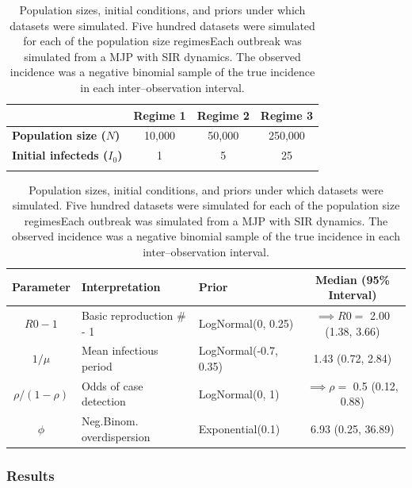 \begin{table}[!ht]
	\label{tab:lna_coverage_sim}
	\caption{Population sizes, initial conditions, and priors under which datasets were simulated. Five hundred datasets were simulated for each of the population size regimesEach outbreak was simulated from a MJP with SIR dynamics. The observed incidence was a negative binomial sample of the true incidence in each inter--observation interval.}\small
	\centering
	\begin{tabular}{lccc}
		
		& \textbf{Regime 1} & \textbf{Regime 2} & \textbf{Regime 3} \\\hline
		\textbf{Population size ($ N $)} & 10,000 & 50,000 & 250,000 \\ 
		\textbf{Initial infecteds ($ I_0 $)} & 1 & 5 & 25 \\
		\hline
		&&&
	\end{tabular} 

	\begin{tabular}{cllc}
		\textbf{Parameter} & \textbf{Interpretation} & \textbf{Prior} & \textbf{Median (95\% Interval)} \\ \hline
		$ R0-1 $ & Basic reproduction \# - 1 & LogNormal(0, 0.25) & $ \implies R0 = $ 2.00 (1.38, 3.66) \\ 
		$ 1/\mu $ & Mean infectious period & LogNormal(-0.7, 0.35)& 1.43 (0.72, 2.84) \\
		$ \rho / (1-\rho) $ & Odds of case detection & LogNormal(0, 1) & $ \implies \rho =$ 0.5 (0.12, 0.88) \\
		$ \phi $ & Neg.Binom. overdispersion & Exponential(0.1) & 6.93 (0.25, 36.89)\\
		\hline
	\end{tabular}
\end{table}

\subsubsection{Results}

